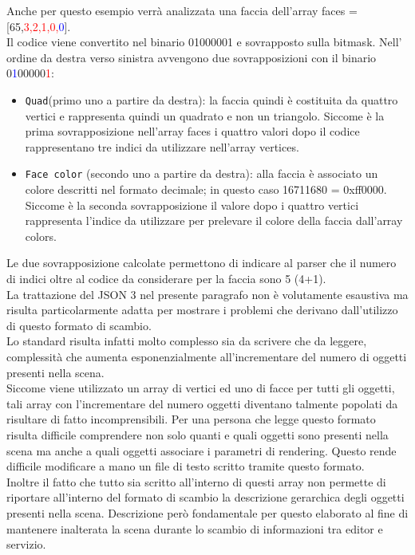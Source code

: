 Anche per questo esempio verrà analizzata una faccia dell'array faces = [65,\textcolor{red}{3,2,1,0,}\textcolor{blue}{0}].
\\
Il codice viene convertito nel binario 01000001 e sovrapposto sulla bitmask.
Nell’ ordine da destra verso sinistra avvengono due sovrapposizioni con il binario 0\textcolor{blue}{1}00000\textcolor{red}{1}:

\begin{itemize}
\item \texttt{Quad}(primo uno a partire da destra): la faccia quindi è costituita da quattro vertici e rappresenta quindi un quadrato e non un triangolo. Siccome è la prima sovrapposizione nell’array faces i quattro valori dopo il codice rappresentano tre indici da utilizzare nell’array vertices.
\item \texttt{Face color} (secondo uno a partire da destra): alla faccia è associato un colore descritti nel formato decimale; in questo caso 16711680 = 0xff0000. Siccome è la seconda sovrapposizione il valore dopo i quattro vertici rappresenta l’indice da utilizzare per prelevare il colore della faccia dall’array colors.
\end{itemize}
Le due sovrapposizione calcolate permettono di indicare al parser che il numero di indici oltre al codice da considerare per la faccia sono 5 (4+1). 
\\
La trattazione del JSON 3 nel presente paragrafo non è volutamente esaustiva ma risulta particolarmente adatta per mostrare i problemi che derivano dall’utilizzo di questo formato di scambio.
\\
Lo standard risulta infatti molto complesso sia da scrivere che da leggere, complessità che aumenta esponenzialmente all’incrementare del numero di oggetti presenti nella scena.
\\
Siccome viene utilizzato un array di vertici ed uno di facce per tutti gli oggetti, tali array con l’incrementare del numero oggetti diventano talmente popolati da risultare di fatto incomprensibili. Per una persona che legge questo formato risulta difficile comprendere non solo quanti e quali oggetti sono presenti nella scena ma anche a quali oggetti associare i parametri di rendering. 
Questo rende difficile modificare a mano un file di testo scritto tramite questo formato.
\\
Inoltre il fatto che tutto sia scritto all’interno di questi array non permette di riportare all’interno del formato di scambio la descrizione gerarchica degli oggetti presenti nella scena.
Descrizione però fondamentale per questo elaborato al fine di mantenere inalterata la scena durante lo scambio di informazioni tra editor e servizio. 
